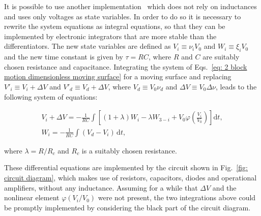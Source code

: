 It is possible to use another implementation~\cite{ref:electronic_analog} which does not rely on inductances
and uses only voltages as state variables. In order to do so it is necessary to rewrite the system equations
as integral equations, so that they can be implemented by electronic integrators that are more stable than
the differentiators. The new state variables are defined as $V_i\equiv \nu_i V_0$ and $W_i\equiv \xi_i V_0$ and
the new time constant is given by $\tau=RC$, where $R$ and $C$ are suitably chosen resistance and capacitance.
Integrating the system of Eqs.~\ref{eq: 2 block motion dimensionless moving surface} for a moving surface and replacing
$V'_i\equiv V_i+\Delta V$ and $V'_d\equiv V_d+\Delta V$, where $V_d\equiv V_0\nu_d$ and $\Delta V\equiv V_0\Delta\nu$,
leads to the following system of equations:

\begin{equation}
    \label{eq: 2 block motion electronic}
    \begin{gathered}
        V_i+\Delta V=-\frac{1}{RC}\int\left[ (1+\lambda)W_i - \lambda W_{3-i}+V_0\varphi\left(\frac{V_i}{V_0}\right) \right]\text{d}t ,\\[10pt]
        W_i=-\frac{1}{RC}\int(V_d-V_i)\,\text{d}t,
    \end{gathered}
\end{equation}

where $\lambda=R/R_c$ and $R_c$ is a suitably chosen resistance.

These differential equations are implemented by the circuit shown in Fig.~\ref{fig: circuit diagram},
which makes use of resistors, capacitors, diodes and operational amplifiers, without any inductance.
Assuming for a while that $\Delta V$ and the nonlinear element $\varphi(V_i/V_0)$ were not present,
the two integrations above could be promptly implemented by considering the black part of the circuit diagram.

